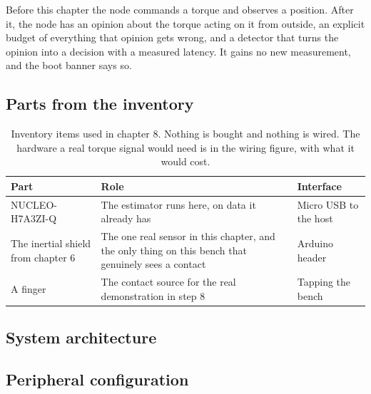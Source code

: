 Before this chapter the node commands a torque and observes a position. After
it, the node has an opinion about the torque acting on it from outside, an
explicit budget of everything that opinion gets wrong, and a detector that turns
the opinion into a decision with a measured latency. It gains no new
measurement, and the boot banner says so.

\subsection*{Parts from the inventory}

\begin{table}[H]\centering\small
\begin{tabular}{p{40mm}p{66mm}p{40mm}}
\toprule
Part & Role & Interface \\
\midrule
NUCLEO-H7A3ZI-Q & The estimator runs here, on data it already has & Micro USB to the host \\
The inertial shield from chapter 6 & The one real sensor in this chapter, and the only thing on this bench that genuinely sees a contact & Arduino header \\
A finger & The contact source for the real demonstration in step 8 & Tapping the bench \\
\bottomrule
\end{tabular}
\caption{Inventory items used in chapter 8. Nothing is bought and nothing is wired. The hardware a real torque signal would need is in the wiring figure, with what it would cost.}
\end{table}

\subsection*{System architecture}


\subsection*{Peripheral configuration}

